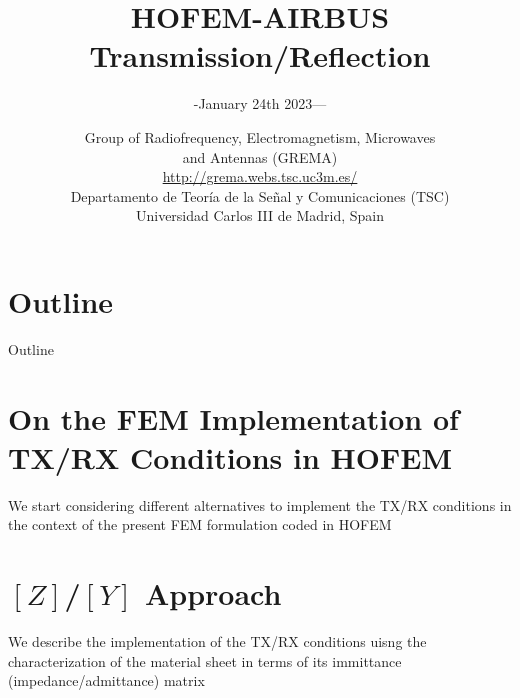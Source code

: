 \documentclass[smaller,xcolor=table,dvipsnames]{beamer}
\title[HOFEM-AIRBUS(v{\rcsInfoRevision})]{HOFEM-AIRBUS Transmission/Reflection}
\author[]{-January 24th 2023---}
\author{}
\date[]{\small{%
    Group of Radiofrequency, Electromagnetism, Microwaves \\ and Antennas (GREMA) \\    \url{http://grema.webs.tsc.uc3m.es/}
 \\[0.8\baselineskip]
    Departamento de Teoría de la Señal y Comunicaciones (TSC) \\
    Universidad Carlos III de Madrid, Spain \\
  }}
\institute{
  \begin{tabular}[h]{cc}
    \multicolumn{2}{c}{Contact: Luis Emilio García-Castillo \url{legcasti@ing.uc3m.es},} \\[-4pt]
    Adrián Amor \url{aamor@ing.uc3m.es}, & Sergio Llorente \url{sllorent@ing.uc3m.es}
  \end{tabular}
}
\newcommand{\dirinputtex}{./inputtex}
\begin{document}
\begin{frame}
  \titlepage
\end{frame}

\section*{Outline}
\begin{frame}[allowframebreaks]{Outline}
  \tableofcontents
\end{frame}



\section{On the FEM Implementation of TX/RX Conditions in HOFEM}

  \begin{frame}[plain]
    \centering \Large{We start considering different alternatives to
      implement the TX/RX conditions in the context of the present FEM
      formulation coded in HOFEM}
    
  \end{frame}

  


\section{$[Z]$/$[Y]$ Approach}

  \begin{frame}[plain]
    \centering \Large{We describe the implementation of the TX/RX
      conditions uisng the characterization of the material sheet in terms of
      its immittance (impedance/admittance) matrix}
    
  \end{frame}

  

\end{document}

